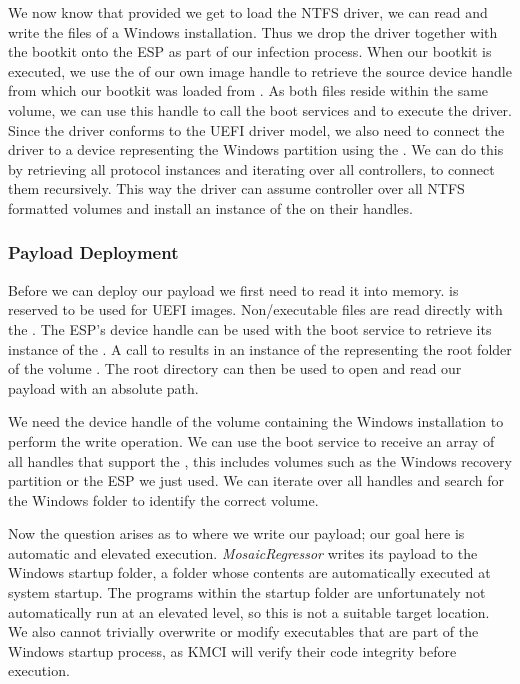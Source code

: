 We now know that provided we get to load the \ac{NTFS} driver, we can read and write the files of a Windows installation.
Thus we drop the driver together with the bootkit onto the \ac{ESP} as part of our infection process.
When our bootkit is executed, we use the  of our own image handle to retrieve the source device handle from which our bootkit was loaded from \cite[Section 9.1]{uefi-spec}.
As both files reside within the same volume, we can use this handle to call the boot services  and  to execute the driver.
Since the driver conforms to the \ac{UEFI} driver model, we also need to connect the driver to a device representing the Windows partition using the .
We can do this by retrieving all protocol instances and iterating over all controllers, to connect them recursively.
This way the driver can assume controller over all \ac{NTFS} formatted volumes and install an instance of the  on their handles.

\subsubsection{Payload Deployment}

Before we can deploy our payload we first need to read it into memory.
 is reserved to be used for \ac{UEFI} images.
Non\-/executable files are read directly with the .
The \ac{ESP}'s device handle can be used with the boot service  to retrieve its instance of the .
A call to  results in an instance of the  representing the root folder of the volume \cite[Section 13.4]{uefi-spec}.
The root directory can then be used to open and read our payload with an absolute path.

We need the device handle of the volume containing the Windows installation to perform the write operation.
We can use the boot service  to receive an array of all handles that support the , this includes volumes such as the Windows recovery partition or the \ac{ESP} we just used.
We can iterate over all handles and search for the Windows folder to identify the correct volume.

Now the question arises as to where we write our payload; our goal here is automatic and elevated execution.
\emph{MosaicRegressor} writes its payload to the Windows startup folder, a folder whose contents are automatically executed at system startup.
The programs within the startup folder are unfortunately not automatically run at an elevated level, so this is not a suitable target location.
We also cannot trivially overwrite or modify executables that are part of the Windows startup process, as \ac{KMCI} will verify their code integrity before execution.

